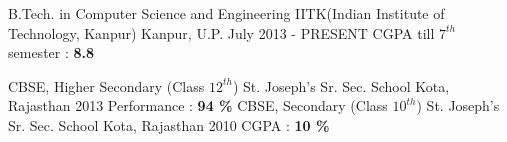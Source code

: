 
\begin{cventries}

  \cventry
    {B.Tech. in Computer Science and Engineering} %
    {IITK(Indian Institute of Technology, Kanpur)} %
    {Kanpur, U.P.} %
    {July 2013 - PRESENT} %
    {
    	CGPA till $7^{th}$ semester : \textbf{8.8}
    }
    
   \cventry
       {CBSE, Higher Secondary (Class $12^{th}$)} %
       {St. Joseph's Sr. Sec. School} %
       {Kota, Rajasthan} %
       {2013} %
       {
       	 Performance : \textbf{94 \%}
       }
	\cventry
	{CBSE, Secondary (Class $10^{th}$)} %
	{St. Joseph's Sr. Sec. School} %
	{Kota, Rajasthan} %
	{2010} %
	{
		CGPA : \textbf{10 \%}
	}
\end{cventries}
